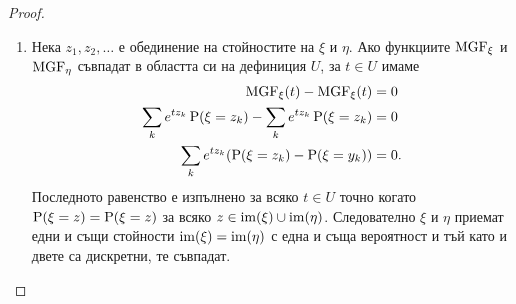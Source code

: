 \documentclass[numbers=endperiod, DIV=15, bibliography=totocnumbered]{scrartcl}
\begin{document}
\begin{proof}
\begin{enumerate}
    \item Нека $z_1, z_2, \ldots$ е обединение на стойностите на $\xi$ и $\eta$. Ако функциите $\operatorname{MGF}_\xi$ и $\operatorname{MGF}_\eta$ съвпадат в областта си на дефиниция $U$, за $t \in U$ имаме
    \begin{align*}
      \operatorname{MGF}_\xi(t) - \operatorname{MGF}_\xi(t) &= 0
      \\
      \sum_k e^{t z_k} \operatorname{P}(\xi = z_k) - \sum_k e^{t z_k} \operatorname{P}(\xi = z_k) &= 0
      \\
      \sum_k e^{t z_k} (\operatorname{P}(\xi = z_k) - \operatorname{P}(\xi = y_k)) &= 0.
    \end{align*}
    Последното равенство е изпълнено за всяко $t \in U$ точно когато $\operatorname{P}(\xi = z) = \operatorname{P}(\xi = z)$ за всяко $z \in \operatorname{im}(\xi) \cup \operatorname{im}(\eta)$. Следователно $\xi$ и $\eta$ приемат едни и същи стойности $\operatorname{im}(\xi) = \operatorname{im}(\eta)$ с една и съща вероятност и тъй като и двете са дискретни, те съвпадат.
  \end{enumerate}
\end{proof}
\end{document}
